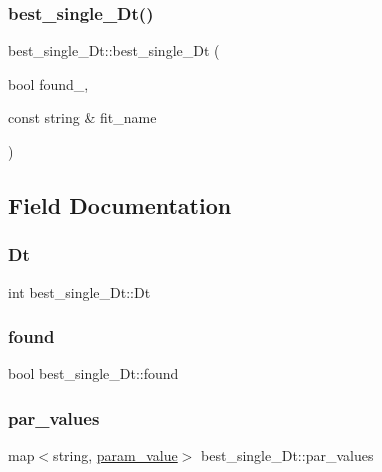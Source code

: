 \subsubsection{\texorpdfstring{best\_single\_Dt()}{best\_single\_Dt()}}
{\footnotesize\ttfamily best\+\_\+single\+\_\+\+Dt\+::best\+\_\+single\+\_\+\+Dt (\begin{DoxyParamCaption}\item[{bool}]{found\+\_\+,  }\item[{const string \&}]{fit\+\_\+name }\end{DoxyParamCaption})\hspace{0.3cm}{\ttfamily [inline]}}



\subsection{Field Documentation}
\mbox{\label{structbest__single__Dt_aea32341d99f8b6a35cbf45ee672dfa85}} 
\subsubsection{\texorpdfstring{Dt}{Dt}}
{\footnotesize\ttfamily int best\+\_\+single\+\_\+\+Dt\+::\+Dt}

\mbox{\label{structbest__single__Dt_adfee5d068623979447ca1a0dd6177ebd}} 
\subsubsection{\texorpdfstring{found}{found}}
{\footnotesize\ttfamily bool best\+\_\+single\+\_\+\+Dt\+::found}

\mbox{\label{structbest__single__Dt_a2ce3cb716e6645217b376f6278671392}} 
\subsubsection{\texorpdfstring{par\_values}{par\_values}}
{\footnotesize\ttfamily map$<$string, \mbox{\hyperlink{structparam__value}{param\+\_\+value}}$>$ best\+\_\+single\+\_\+\+Dt\+::par\+\_\+values}

